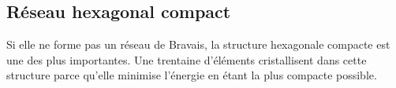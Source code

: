 \subsection{Réseau hexagonal compact}



Si elle ne forme pas un réseau de Bravais, la structure hexagonale compacte
est une des plus importantes. Une  trentaine d'éléments %
cristallisent dans cette structure parce qu'elle minimise l'énergie en étant
la plus compacte possible.

